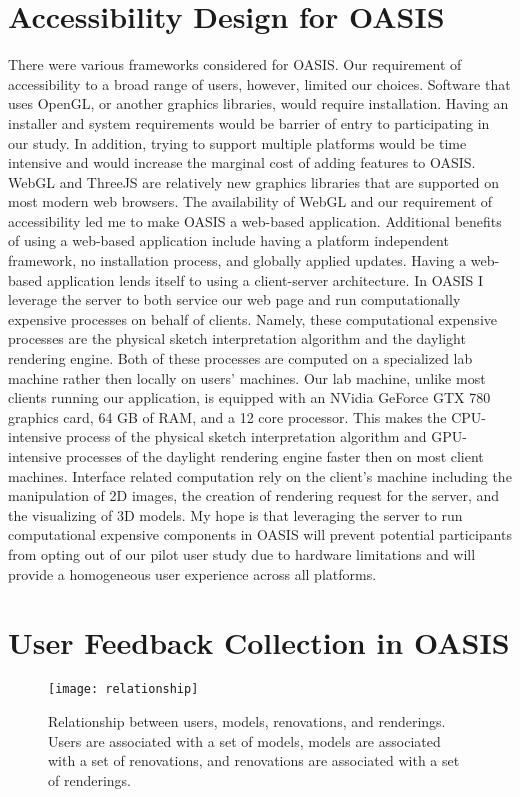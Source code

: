 \section{Accessibility Design for OASIS}
	There were various frameworks considered for OASIS.
	Our requirement of accessibility to a broad range of users, however, limited our choices.
	Software that uses OpenGL, or another graphics libraries, would require installation.
	Having an installer and system requirements would be barrier of entry to participating in our study.
	In addition, trying to support multiple platforms would be time intensive and would increase the marginal cost of adding features to OASIS.
	WebGL and ThreeJS are relatively new graphics libraries that are supported on most modern web browsers.
	The availability of WebGL and our requirement of accessibility led me to make OASIS a web-based application.
	Additional benefits of using a web-based application include having a platform independent framework, no installation process, and globally applied updates.
	Having a web-based application lends itself to using a client-server architecture.
	In OASIS I leverage the server to both service our web page and run computationally expensive processes on behalf of clients.
	Namely, these computational expensive processes are the physical sketch interpretation algorithm and the daylight rendering engine.
	Both of these processes are computed on a specialized lab machine rather then locally on users' machines.
	Our lab machine, unlike most clients running our application, is equipped with an NVidia GeForce GTX 780 graphics card, 64 GB of RAM, and a 12 core processor.
	This makes the CPU-intensive process of the physical sketch interpretation algorithm and GPU-intensive processes of the daylight rendering engine faster then on most client machines.
	Interface related computation rely on the client's machine including the manipulation of 2D images, the creation of rendering request for the server, and the visualizing of 3D models.
	My hope is that leveraging the server to run computational expensive components in OASIS will prevent potential participants from opting out of our pilot user study due to hardware limitations and will provide a homogeneous user experience across all platforms.


\section{User Feedback  Collection in OASIS}

	\begin{figure}
	\texttt{[image: relationship]}
	\caption{Relationship between users, models, renovations, and renderings. Users are associated with a set of models, models are associated with a set of renovations, and renovations are associated with a set of renderings.}
	\label{fig:rel}
	\end{figure}

